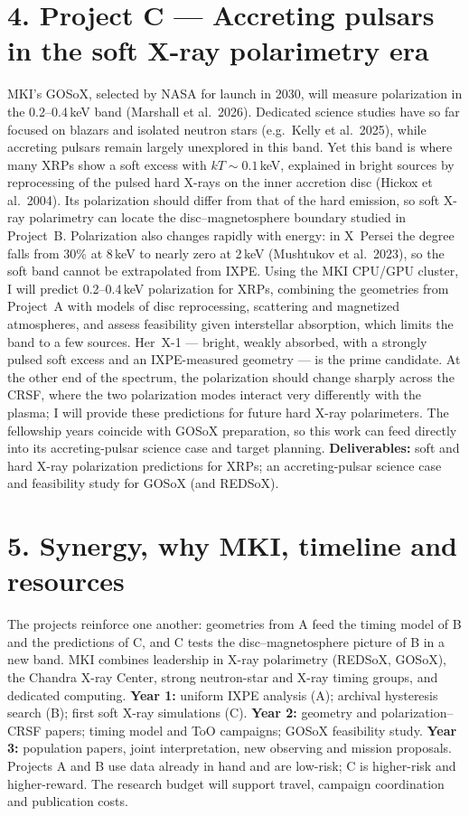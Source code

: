 \documentclass[11pt]{article}
\begin{document}
\section*{4. Project C --- Accreting pulsars in the soft X-ray polarimetry era}
MKI's GOSoX, selected by NASA for launch in 2030, will measure polarization in the
0.2--0.4\,keV band (Marshall et al.\ 2026). Dedicated science studies have so far focused
on blazars and isolated neutron stars (e.g.\ Kelly et al.\ 2025), while accreting pulsars
remain largely unexplored in this band. Yet this band is where many XRPs show a soft excess with $kT\sim0.1$\,keV,
explained in bright sources by reprocessing of the pulsed hard X-rays on the inner
accretion disc (Hickox et al.\ 2004). Its polarization should differ from that of the
hard emission, so soft X-ray polarimetry can locate the disc--magnetosphere boundary
studied in Project~B. Polarization also changes rapidly with energy: in X~Persei the
degree falls from 30\% at 8\,keV to nearly zero at 2\,keV (Mushtukov et al.\ 2023), so
the soft band cannot be extrapolated from IXPE. Using the MKI CPU/GPU cluster, I will
predict 0.2--0.4\,keV polarization for XRPs, combining the geometries from Project~A
with models of disc reprocessing, scattering and magnetized atmospheres, and assess
feasibility given interstellar absorption, which limits the band to a few sources.
Her~X-1 --- bright, weakly absorbed, with a strongly pulsed soft excess and an
IXPE-measured geometry --- is the prime candidate. At the other end of the spectrum, the
polarization should change sharply across the CRSF, where the two polarization modes
interact very differently with the plasma; I will provide these predictions for future
hard X-ray polarimeters. The fellowship years coincide with GOSoX preparation, so this
work can feed directly into its accreting-pulsar science case and target planning.
\textbf{Deliverables:} soft and hard X-ray polarization predictions for XRPs; an
accreting-pulsar science case and feasibility study for GOSoX (and REDSoX).

\section*{5. Synergy, why MKI, timeline and resources}
The projects reinforce one another: geometries from A feed the timing model of B and the
predictions of C, and C tests the disc--magnetosphere picture of B in a new band. MKI
combines leadership in X-ray polarimetry (REDSoX, GOSoX), the Chandra X-ray Center,
strong neutron-star and X-ray timing groups, and dedicated computing.
\textbf{Year 1:} uniform IXPE analysis (A); archival hysteresis search (B); first soft
X-ray simulations (C). \textbf{Year 2:} geometry and polarization--CRSF papers; timing
model and ToO campaigns; GOSoX feasibility study. \textbf{Year 3:} population
papers, joint interpretation, new observing and mission proposals. Projects A and B use
data already in hand and are low-risk; C is higher-risk and higher-reward. The research
budget will support travel, campaign coordination and publication costs.
\end{document}
